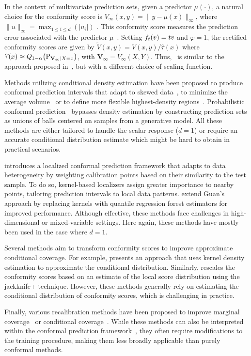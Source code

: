   In the context of multivariate prediction sets, given a predictor \(\mu(\cdot)\), a natural choice for the conformity score is \(V_\infty(x, y) = \|y - \mu(x)\|_{\infty}\), where $\| u \|_{\infty}= \max_{1 \leq t \leq d}(|u_i|)$ \citep{Diquigiovanni2021-bh}. This conformity score measures the prediction error associated with the predictor \(\mu\)~\cite{nouretdinov2001ridge,vovk2005algorithmic,vovk2009line}. 
  Setting \(f_{t}(v) = t v\) and $\varphi = 1$, the rectified conformity scores are given by $\tilde{V}(x, y) = V(x, y)/ \widehat{\tau}(x)$ where \(\widehat{\tau}(x) \approx Q_{1-\alpha}\bigl(\textup{P}_{\mathbf{V}_\infty \mid X = x}\bigr)\), with $\mathbf{V}_\infty= V_\infty(X,Y)$. Thus, \RCP\ is similar to the approach proposed in~\cite{lei2018distribution}, but with a different choice of scaling function. 

  Methods utilizing conditional density estimation have been proposed to produce conformal prediction intervals that adapt to skewed data~\citep{sesia2021conformal}, to minimize the average volume~\citep[][denoted DCP in our paper]{Sadinle2016-yr} or to define more flexible highest-density regions~\citep{izbicki2022cd,plassier2024conditionally}. Probabilistic conformal prediction~\citep[PCP;][]{wang2023probabilistic} bypasses density estimation by constructing prediction sets as unions of balls centered on samples from a generative model. All these methods are either tailored to handle the scalar response ($d = 1$) or require an accurate conditional distribution estimate which might be hard to obtain in practical scenarios.

  \citet{guan2023localized} introduces a localized conformal prediction framework that adapts to data heterogeneity by weighting calibration points based on their similarity to the test sample. To do so, kernel-based localizers assign greater importance to nearby points, tailoring prediction intervals to local data patterns. \citet{amoukou2023adaptive} extend Guan's approach by replacing kernels with quantile regression forest estimators for improved performance. Although effective, these methods face challenges in high-dimensional or mixed-variable settings. Here again, these methods have mostly been used in the case where $d=1$.

  Several methods aim to transform conformity scores to improve approximate conditional coverage. For example, \citet{han2022split} presents an approach that uses kernel density estimation to approximate the conditional distribution. Similarly, \citet{deutschmann2023adaptive} rescales the conformity scores based on an estimate of the local score distribution using the jackknife+ technique. However, these methods generally rely on estimating the conditional distribution of conformity scores, which is challenging in practice.

  Finally, various recalibration methods have been proposed to improve marginal coverage~\citep{dheur2023large} or conditional coverage~\citep{dey2022conditionally}. While these methods can also be interpreted within the conformal prediction framework~\citep{dheur2024probabilistic,marx2022modular}, they often require modifications to the training procedure, making them less broadly applicable than purely conformal methods.
